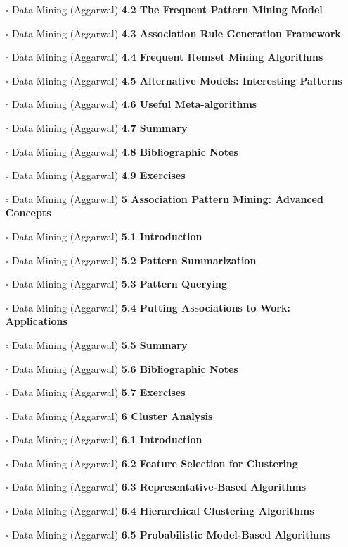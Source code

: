 \documentclass[a4, landscape, 12pt]{article}
\newcommand{\checkbox}{$\square$}%
\begin{document}
\begin{itemize}
{}
\item [\checkbox]  Data Mining (Aggarwal) \textbf{ 4.2 The Frequent Pattern Mining Model
}
\item [\checkbox]  Data Mining (Aggarwal) \textbf{ 4.3 Association Rule Generation Framework
}
\item [\checkbox]  Data Mining (Aggarwal) \textbf{ 4.4 Frequent Itemset Mining Algorithms
}
\item [\checkbox]  Data Mining (Aggarwal) \textbf{ 4.5 Alternative Models: Interesting Patterns
}
\item [\checkbox]  Data Mining (Aggarwal) \textbf{ 4.6 Useful Meta-algorithms
}
\item [\checkbox]  Data Mining (Aggarwal) \textbf{ 4.7 Summary
}
\item [\checkbox]  Data Mining (Aggarwal) \textbf{ 4.8 Bibliographic Notes
}
\item [\checkbox]  Data Mining (Aggarwal) \textbf{ 4.9 Exercises
}
\item [\checkbox]  Data Mining (Aggarwal) \textbf{ 5 Association Pattern Mining: Advanced Concepts
}
\item [\checkbox]  Data Mining (Aggarwal) \textbf{ 5.1 Introduction
}
\item [\checkbox]  Data Mining (Aggarwal) \textbf{ 5.2 Pattern Summarization
}
\item [\checkbox]  Data Mining (Aggarwal) \textbf{ 5.3 Pattern Querying
}
\item [\checkbox]  Data Mining (Aggarwal) \textbf{ 5.4 Putting Associations to Work: Applications
}
\item [\checkbox]  Data Mining (Aggarwal) \textbf{ 5.5 Summary
}
\item [\checkbox]  Data Mining (Aggarwal) \textbf{ 5.6 Bibliographic Notes
}
\item [\checkbox]  Data Mining (Aggarwal) \textbf{ 5.7 Exercises
}
\item [\checkbox]  Data Mining (Aggarwal) \textbf{ 6 Cluster Analysis
}
\item [\checkbox]  Data Mining (Aggarwal) \textbf{ 6.1 Introduction
}
\item [\checkbox]  Data Mining (Aggarwal) \textbf{ 6.2 Feature Selection for Clustering
}
\item [\checkbox]  Data Mining (Aggarwal) \textbf{ 6.3 Representative-Based Algorithms
}
\item [\checkbox]  Data Mining (Aggarwal) \textbf{ 6.4 Hierarchical Clustering Algorithms
}
\item [\checkbox]  Data Mining (Aggarwal) \textbf{ 6.5 Probabilistic Model-Based Algorithms
}
\end{itemize}
\end{document}
